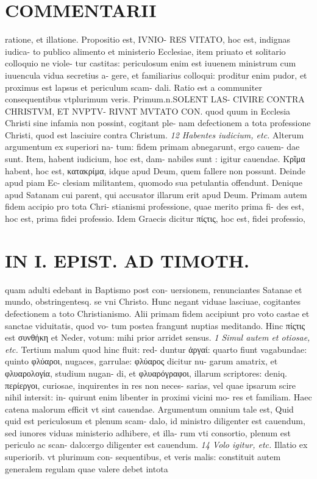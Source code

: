 \documentclass{article}
\begin{document}
\begin{pages}
\section*{COMMENTARII }
\marginpar{[ p.128 ]}\pstart ratione, et illatione. Propositio est, IVNIO- RES VITATO, hoc est, indignas iudica- to publico alimento et ministerio Ecclesiae, item priuato et solitario colloquio ne viole- tur castitas: periculosum enim est iuuenem ministrum cum iuuencula vidua secretius a- gere, et familiarius colloqui: proditur enim pudor, et proximus est lapsus et periculum scam- dali. Ratio est a communiter consequentibus vtplurimum veris. Primum.n.SOLENT LAS- CIVIRE CONTRA CHRISTVM, ET NVPTV- RIVNT MVTATO CON. quod quum in Ecclesia Christi sine infamia non possint, cogitant ple- nam defectionem a tota professione Christi, quod est lasciuire contra Christum.  \pend
\textit{12 Habentes iudicium, etc. }\pstart Alterum argumentum ex superiori na- tum: fidem primam abnegarunt, ergo cauem- dae sunt. Item, habent iudicium, hoc est, dam- nabiles sunt : igitur cauendae. Κρῖμα habent, hoc est, κατακρίμα, idque apud Deum, quem fallere non possunt. Deinde apud piam Ec- clesiam militantem, quomodo sua petulantia offendunt. Denique apud Satanam cui parent, qui accusator illarum erit apud Deum.  \pend\pstart Primam autem fidem accipio pro tota Chri- stianismi professione, quae merito prima fi- des est, hoc est, prima fidei professio. Idem Graecis dicitur πίςτις, hoc est, fidei professio,  \pend
\section*{IN I. EPIST. AD TIMOTH. }
\marginpar{[ p.129 ]}\pstart quam adulti edebant in Baptismo post con- uersionem, renunciantes Satanae et mundo, obstringentesq. se vni Christo. Hunc negant viduae lasciuae, cogitantes defectionem a toto Christianismo. Alii primam fidem accipiunt pro voto castae et sanctae viduitatis, quod vo- tum postea frangunt nuptias meditando. Hinc πίςτις est συνθήκη et Neder, votum: mihi prior arridet sensus.  \pend
\textit{1 Simul autem et otiosae, etc. }\pstart Tertium malum quod hinc fluit: red- duntur ἀργαί: quarto fiunt vagabundae: quinto φλύαροι, nugaces, garrulae: φλύαρος dicitur nu- garum amatrix, et φλυαρολογία, studium nugan- di, et φλυαρόγραφοι, illarum scriptores: deniq. περίεργοι, curiosae, inquirentes in res non neces- sarias, vel quae ipsarum scire nihil intersit: in- quirunt enim libenter in proximi vicini mo- res et familiam. Haec catena malorum efficit vt sint cauendae. Argumentum omnium tale est, Quid quid est periculosum et plenum scam- dalo, id ministro diligenter est cauendum, sed iunores viduas ministerio adhibere, et illa- rum vti consortio, plenum est periculo ac scan- dalo:ergo diligenter est cauendum.  \pend
\textit{14 Volo igitur, etc. }\pstart Illatio ex superiorib. vt plurimum con- sequentibus, et veris malis: constituit autem generalem regulam quae valere debet intota  \pend

\end{pages}
\end{document}
